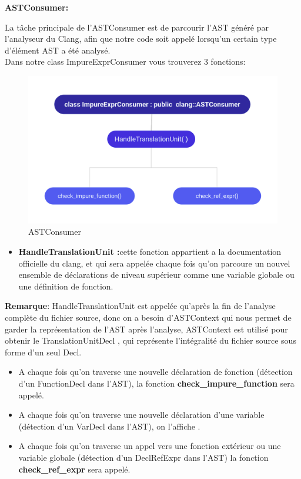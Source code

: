 \documentclass[12pt,a4paper]{article}
\begin{document}
\textbf{ASTConsumer:} 

La tâche principale de l’ASTConsumer est de parcourir  l'AST généré par l'analyseur du Clang, afin que notre code soit appelé lorsqu'un certain type d'élément AST a été analysé.\\
Dans notre class ImpureExprConsumer vous trouverez 3 fonctions:
\begin{figure}[H]
\centering
\includegraphics[scale=0.75]{cons-3.png} 
\caption[ASTConsumer]{ASTConsumer} 
\end{figure}

\begin{itemize}
    \item \textbf{HandleTranslationUnit :}cette fonction appartient a la documentation officielle du clang, et qui sera appelée chaque fois qu’on parcoure un nouvel ensemble de déclarations de niveau supérieur comme une variable globale ou une  définition de fonction.
\end{itemize}

\textbf{Remarque}: HandleTranslationUnit est appelée qu'après la fin de l’analyse complète du fichier source, donc on a besoin d’ASTContext qui nous permet de garder la représentation de l’AST après l’analyse, ASTContext  est utilisé pour obtenir le TranslationUnitDecl , qui représente l'intégralité du fichier source sous forme d’un seul Decl. \\

\begin{itemize}
\item A chaque fois qu’on traverse une nouvelle déclaration de fonction (détection d’un FunctionDecl dans l’AST), la fonction \textbf{check\_impure\_function}  sera appelé.
\item A chaque fois qu’on traverse une nouvelle déclaration d’une variable (détection d’un VarDecl dans l’AST), on l’affiche .
 \item A chaque fois qu’on traverse un appel vers une fonction extérieur ou une variable globale (détection d’un DeclRefExpr dans l’AST) la fonction \textbf{ check\_ref\_expr} sera appelé.
 \end{itemize}
\end{document}
